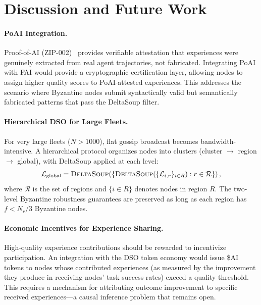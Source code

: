 \section{Discussion and Future Work}

\label{sec:discussion}

\paragraph{PoAI Integration.}
Proof-of-AI (ZIP-002)~\cite{hanzo2026poai} provides verifiable attestation
that experiences were genuinely extracted from real agent trajectories, not
fabricated. Integrating PoAI with FAI would provide a cryptographic
certification layer, allowing nodes to assign higher quality scores to
PoAI-attested experiences. This addresses the scenario where Byzantine nodes
submit syntactically valid but semantically fabricated patterns that pass
the DeltaSoup filter.

\paragraph{Hierarchical DSO for Large Fleets.}
For very large fleets ($N > 1000$), flat gossip broadcast becomes bandwidth-
intensive. A hierarchical protocol organizes nodes into clusters
(cluster $\to$ region $\to$ global), with DeltaSoup applied at each level:
\begin{equation}
    \mathcal{L}_{\text{global}} = \textsc{DeltaSoup}\!\left(
        \left\{\textsc{DeltaSoup}(\{\mathcal{L}_{i,r}\}_{i \in R}) : r \in \mathcal{R}\right\}
    \right),
\end{equation}
where $\mathcal{R}$ is the set of regions and $\{i \in R\}$ denotes nodes in
region $R$. The two-level Byzantine robustness guarantees are preserved as
long as each region has $f < N_r / 3$ Byzantine nodes.

\paragraph{Economic Incentives for Experience Sharing.}
High-quality experience contributions should be rewarded to incentivize
participation. An integration with the DSO token economy would issue \$AI
tokens to nodes whose contributed experiences (as measured by the improvement
they produce in receiving nodes' task success rates) exceed a quality
threshold. This requires a mechanism for attributing outcome improvement to
specific received experiences---a causal inference problem that remains open.

